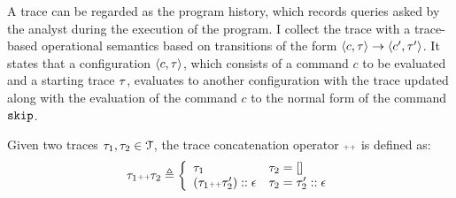 A trace can be regarded as the program history, which records queries asked by the analyst during the execution of the program. I collect the trace with a trace-based operational semantics based on transitions of the form $ \langle c, \mathtt{\tau} \rangle \to \langle c', \mathtt{\tau}' \rangle $. It states that a configuration $\langle c, \mathtt{\tau} \rangle$, which consists of a command $c$ to be evaluated and a starting trace $\mathtt{\tau}$, evaluates to another configuration with the trace updated along with the evaluation of the command $c$ to the normal form of the command $\mathtt{skip}$.
\begin{defn}
  Given two traces $\mathtt{\tau}_1, \mathtt{\tau}_2 \in \mathcal{T}$, the trace concatenation operator 
  ${\scriptscriptstyle ++}$ is defined as:
  \[
    \trace_1 \tracecat \trace_2 \triangleq
    \left\{
    \begin{array}{ll} 
       \trace_1 & \trace_2 = [] \\
       (\trace_1  \tracecat \trace_2')  :: \event & \trace_2 = \trace_2' :: \event
    \end{array}
    \right.
  \]
  \end{defn}
